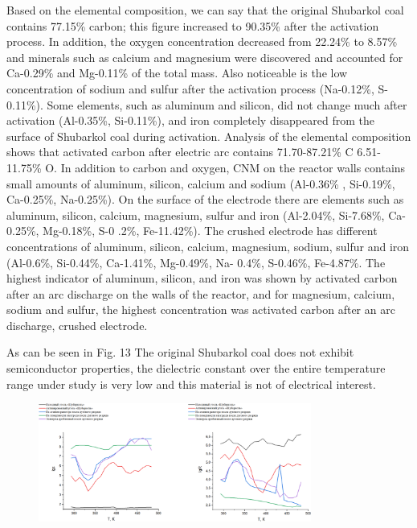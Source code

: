 Based on the elemental composition, we can say that the original
Shubarkol coal contains 77.15\% carbon; this figure increased to 90.35\%
after the activation process. In addition, the oxygen concentration
decreased from 22.24\% to 8.57\% and minerals such as calcium and
magnesium were discovered and accounted for Ca-0.29\% and Mg-0.11\% of
the total mass. Also noticeable is the low concentration of sodium and
sulfur after the activation process (Na-0.12\%, S-0.11\%). Some
elements, such as aluminum and silicon, did not change much after
activation (Al-0.35\%, Si-0.11\%), and iron completely disappeared from
the surface of Shubarkol coal during activation. Analysis of the
elemental composition shows that activated carbon after electric arc
contains 71.70-87.21\% C 6.51-11.75\% O. In addition to carbon and
oxygen, CNM on the reactor walls contains small amounts of aluminum,
silicon, calcium and sodium (Al-0.36\% , Si-0.19\%, Ca-0.25\%,
Na-0.25\%). On the surface of the electrode there are elements such as
aluminum, silicon, calcium, magnesium, sulfur and iron (Al-2.04\%,
Si-7.68\%, Ca-0.25\%, Mg-0.18\%, S-0 .2\%, Fe-11.42\%). The crushed
electrode has different concentrations of aluminum, silicon, calcium,
magnesium, sodium, sulfur and iron (Al-0.6\%, Si-0.44\%, Ca-1.41\%,
Mg-0.49\%, Na- 0.4\%, S-0.46\%, Fe-4.87\%. The highest indicator of
aluminum, silicon, and iron was shown by activated carbon after an arc
discharge on the walls of the reactor, and for magnesium, calcium,
sodium and sulfur, the highest concentration was activated carbon after
an arc discharge, crushed electrode.

As can be seen in Fig. 13 The original Shubarkol coal does not exhibit
semiconductor properties, the dielectric constant over the entire
temperature range under study is very low and this material is not of
electrical interest.

\begin{figure}[H]
	\centering
	\includegraphics[width=0.8\textwidth]{assets/65}
	\caption*{}
\end{figure}

